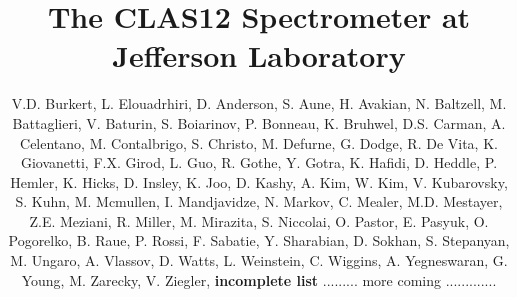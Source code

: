 \documentclass[final,3p,twocolumn]{elsarticle}
\begin{document}
\begin{frontmatter}

  \title{The CLAS12 Spectrometer at Jefferson Laboratory}
\author{V.D. Burkert, L. Elouadrhiri, D. Anderson, S. Aune, H. Avakian, N. Baltzell, M. Battaglieri,  V. Baturin,
  S. Boiarinov, P. Bonneau, K. Bruhwel, D.S. Carman, A. Celentano, M. Contalbrigo, S. Christo, M. Defurne, G. Dodge,
  R. De Vita, K. Giovanetti, F.X. Girod, L. Guo, R. Gothe, Y. Gotra, K. Hafidi, D. Heddle, P. Hemler, K. Hicks, D. Insley, K. Joo,
  D. Kashy, A. Kim, W. Kim, V. Kubarovsky, S. Kuhn, M. Mcmullen, I. Mandjavidze, N. Markov, C. Mealer, M.D. Mestayer,
  Z.E. Meziani, R. Miller, M. Mirazita, S. Niccolai, O. Pastor, E. Pasyuk, O. Pogorelko, B. Raue, P. Rossi, F. Sabatie,
  Y. Sharabian, D. Sokhan, S. Stepanyan, M. Ungaro, A. Vlassov, D. Watts, L. Weinstein, C. Wiggins, A. Yegneswaran, 
  G. Young, M. Zarecky, V. Ziegler, {\bf incomplete list} ......... more coming ............. }

\end{frontmatter}
\end{document}
